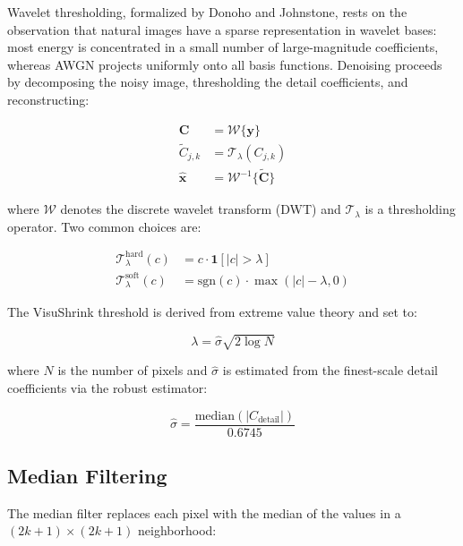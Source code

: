 \documentclass[conference]{IEEEtran}
\begin{document}
Wavelet thresholding, formalized by Donoho and Johnstone, rests on the observation that natural images have a sparse representation in wavelet bases: most energy is concentrated in a small number of large-magnitude coefficients, whereas AWGN projects uniformly onto all basis functions. Denoising proceeds by decomposing the noisy image, thresholding the detail coefficients, and reconstructing:

\begin{align}
  \mathbf{C} &= \mathcal{W}\{\mathbf{y}\} \label{eq:wt_forward} \\
  \tilde{C}_{j,k} &= \mathcal{T}_\lambda(C_{j,k}) \label{eq:wt_threshold} \\
  \hat{\mathbf{x}} &= \mathcal{W}^{-1}\{\tilde{\mathbf{C}}\} \label{eq:wt_inverse}
\end{align}

where $\mathcal{W}$ denotes the discrete wavelet transform (DWT) and $\mathcal{T}_\lambda$ is a thresholding operator. Two common choices are:

\begin{align}
  \mathcal{T}^{\text{hard}}_\lambda(c) &= c \cdot \mathbf{1}[|c| > \lambda]
  \label{eq:hard_thresh} \\
  \mathcal{T}^{\text{soft}}_\lambda(c) &= \text{sgn}(c) \cdot \max(|c| - \lambda, 0)
  \label{eq:soft_thresh}
\end{align}

The VisuShrink threshold is derived from extreme value theory and set to:

\begin{equation}
  \lambda = \hat{\sigma} \sqrt{2 \log N}
  \label{eq:visushrink}
\end{equation}

where $N$ is the number of pixels and $\hat{\sigma}$ is estimated from the finest-scale detail coefficients via the robust estimator:

\begin{equation}
  \hat{\sigma} = \frac{\text{median}(|C_{\text{detail}}|)}{0.6745}
  \label{eq:sigma_est}
\end{equation}

\subsection{Median Filtering}

The median filter replaces each pixel with the median of the values in a
$(2k+1) \times (2k+1)$ neighborhood:
\end{document}
